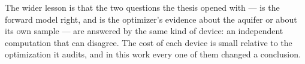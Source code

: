 The wider lesson is that the two questions the thesis opened with --- is the
forward model right, and is the optimizer's evidence about the aquifer or about
its own sample --- are answered by the same kind of device: an independent
computation that can disagree. The cost of each device is small relative to the
optimization it audits, and in this work every one of them changed a conclusion.
